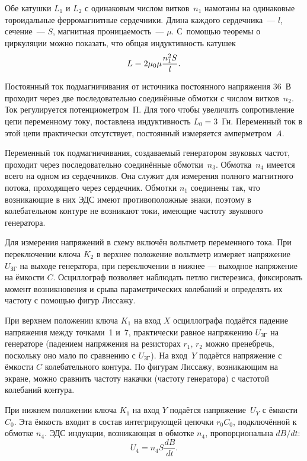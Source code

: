 Обе катушки $L_1$ и $L_2$ с одинаковым числом витков~$n_1$ намотаны на
одинаковые тороидальные ферромагнитные сердечники. Длина каждого сердечника~---
$l$, сечение~--- $S$, магнитная проницаемость~--- $\mu$. 
С~помощью теоремы о циркуляции можно показать, что общая индуктивность катушек
\begin{equation}
	\eqmark{4.6.5}
	L = 2\mu_0\mu\frac{n^2_1S}{l}.
\end{equation}

Постоянный ток подмагничивания от источника постоянного напряжения 36~В проходит
через две последовательно соединённые обмотки с числом витков~$n_2$. Ток
регулируется потенциометром~$\text{П}$. Для того чтобы увеличить сопротивление
цепи переменному току, поставлена индуктивность $L_0 = 3$~Гн. Переменный ток в
этой цепи практически отсутствует, постоянный измеряется амперметром~$A$.

Переменный ток подмагничивания, создаваемый генератором звуковых частот,
проходит через последовательно соединённые обмотки~$n_3$. Обмотка~$n_4$ имеется
всего на одном из сердечников. Она служит для измерения полного магнитного
потока, проходящего через сердечник. Обмотки $n_1$ соединены так, что
возникающие в них ЭДС имеют противоположные знаки, поэтому в колебательном
контуре не возникают токи, имеющие частоту звукового генератора.

Для измерения напряжений в схему включён вольтметр переменного тока. При
переключении ключа $K_2$ в верхнее положение вольтметр измеряет напряжение
$U_\text{ЗГ}$ на выходе генератора, при переключении в нижнее --- выходное
напряжение на ёмкости $C$. Осциллограф позволяет наблюдать петлю гистерезиса,
фиксировать момент возникновения и срыва параметрических колебаний и определять
их частоту с помощью фигур Лиссажу.

При верхнем положении ключа $K_1$ на вход $X$ осциллографа подаётся падение
напряжения между точками~1 и~7, практически равное напряжению $U_{\text{ЗГ}}$ на
генераторе (падением напряжения на резисторах $r_1$, $r_2$ можно пренебречь,
поскольку оно мало по сравнению с $U_{\text{ЗГ}}$). На вход~$Y$ подаётся
напряжение с ёмкости $C$ колебательного контура. По фигурам Лиссажу, возникающим
на экране, можно сравнить частоту накачки (частоту генератора) с частотой
колебаний контура.

При нижнем положении ключа $K_1$ на вход $Y$ подаётся напряжение~$U_Y$ 
с ёмкости~$C_0$. Эта ёмкость входит в состав интегрирующей цепочки $r_0C_0$, подключённой
к обмотке $n_4$. ЭДС индукции, возникающая в обмотке $n_4$, пропорциональна
$dB/dt$:
\begin{equation*}
	U_4 = n_4S\frac{dB}{dt}.
\end{equation*}

